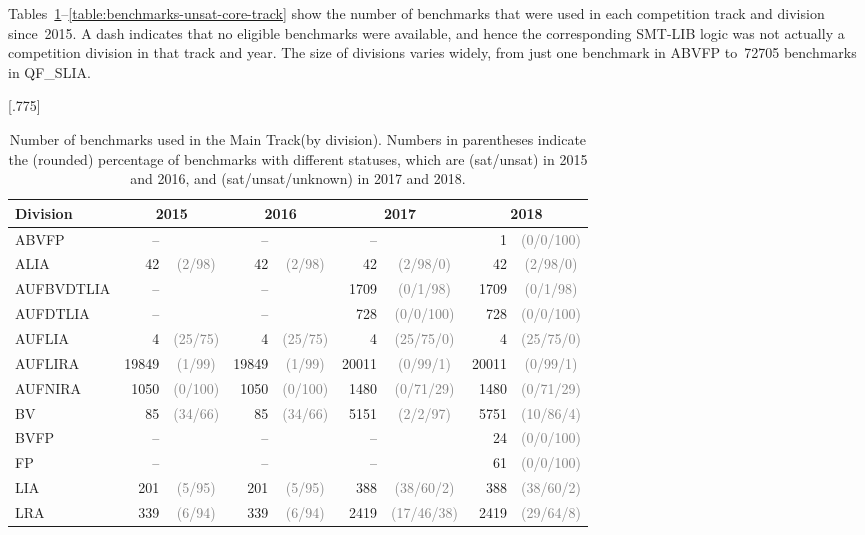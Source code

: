 \documentclass[dvipsnames,table,twoside,11pt]{article}
\newcommand{\maintrack}{Main Track\xspace}
\newcommand{\gray}[1]{\textcolor{gray}{#1}}
\begin{document}
Tables~\ref{table:benchmarks-main-track}--\ref{table:benchmarks-unsat-core-track}
show the number of benchmarks that were used in each competition track
and division since~2015.  A dash indicates that no eligible benchmarks
were available, and hence the corresponding SMT-LIB logic was not
actually a competition division in that track and year.  The size of
divisions varies widely, from just one benchmark in ABVFP to~\num{72705}
benchmarks in QF\_SLIA.

\begin{table}
  \caption{Number of benchmarks used in the \maintrack (by division). Numbers in parentheses indicate the (rounded) percentage of benchmarks with different statuses, which are (sat/unsat) in 2015 and 2016, and (sat/unsat/unknown) in 2017 and 2018.}
  \label{table:benchmarks-main-track}
  \centering
  \scalebox{.9}[.775]{\begin{tabular}{lr@{\hskip3pt}cr@{\hskip3pt}cr@{\hskip3pt}cr@{\hskip3pt}c}
    \toprule
    Division & \multicolumn{2}{c}{2015} & \multicolumn{2}{c}{2016} & \multicolumn{2}{c}{2017} & \multicolumn{2}{c}{2018} \\
    \midrule
    ABVFP & -- & & -- & & -- & & 1 & \gray{(0/0/100)}\\
    ALIA & 42 & \gray{(2/98)} & 42 & \gray{(2/98)} & 42 & \gray{(2/98/0)} & 42 & \gray{(2/98/0)}\\
    AUFBVDTLIA & -- & & -- & & 1709 & \gray{(0/1/98)} & 1709 & \gray{(0/1/98)}\\
    AUFDTLIA & -- & & -- & & 728 & \gray{(0/0/100)} & 728 & \gray{(0/0/100)}\\
    AUFLIA & 4 & \gray{(25/75)} & 4 & \gray{(25/75)} & 4 & \gray{(25/75/0)} & 4 & \gray{(25/75/0)}\\
    AUFLIRA & 19849 & \gray{(1/99)} & 19849 & \gray{(1/99)} & 20011 & \gray{(0/99/1)} & 20011 & \gray{(0/99/1)}\\
    AUFNIRA & 1050 & \gray{(0/100)} & 1050 & \gray{(0/100)} & 1480 & \gray{(0/71/29)} & 1480 & \gray{(0/71/29)}\\
    BV & 85 & \gray{(34/66)} & 85 & \gray{(34/66)} & 5151 & \gray{(2/2/97)} & 5751 & \gray{(10/86/4)}\\
    BVFP & -- & & -- & & -- & & 24 & \gray{(0/0/100)}\\
    FP & -- & & -- & & -- & & 61 & \gray{(0/0/100)}\\
    LIA & 201 & \gray{(5/95)} & 201 & \gray{(5/95)} & 388 & \gray{(38/60/2)} & 388 & \gray{(38/60/2)}\\
    LRA & 339 & \gray{(6/94)} & 339 & \gray{(6/94)} & 2419 & \gray{(17/46/38)} & 2419 & \gray{(29/64/8)}\\

\end{tabular}}
\end{table}
\end{document}
